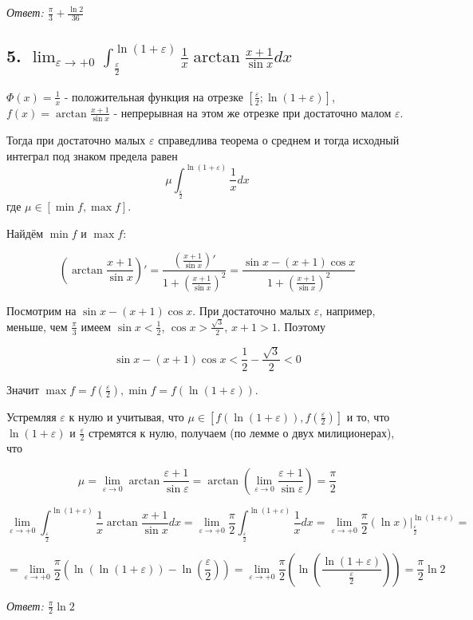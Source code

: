 \documentclass[a4paper]{article}
\begin{document}
\textit{Ответ: $\frac{\pi}{3} + \frac{\ln 2}{36}$}


\subsection*{5. $\displaystyle \lim_{\varepsilon \rightarrow +0} \int_{\frac{\varepsilon}{2}}^{\ln (1+\varepsilon)} \frac{1}{x} \arctan \frac{x+1}{\sin x} dx$}

$\Phi(x) =\frac{1}{x}$ - положительная функция на отрезке $[\frac{\varepsilon}{2}; \ln (1+\varepsilon)]$,
$f(x) = \arctan \frac{x+1}{\sin x}$ - непрерывная на этом же отрезке при достаточно малом $\varepsilon$.
 
Тогда при достаточно малых $\varepsilon$ справедлива теорема о среднем и тогда исходный интеграл под знаком предела равен \[\mu \int_{\frac{\varepsilon}{2}}^{\ln (1+\varepsilon)} \frac{1}{x} dx\] где $\mu \in [\min f, \max f]$.

Найдём $\min f$ и $\max f$:

\[
\left( \arctan \frac{x+1}{\sin x} \right)' = \frac{\left(\frac{x+1}{\sin x}\right)'}{1+\left( \frac{x+1}{\sin x} \right)^2} =  \frac{\sin x - (x+1) \cos x}{1+\left( \frac{x+1}{\sin x} \right)^2}
\]

Посмотрим на $\sin x - (x+1) \cos x$. При достаточно малых $\varepsilon$, например, меньше, чем $\frac{\pi}{3}$ имеем $\sin x < \frac{1}{2}$, $\cos x > \frac{\sqrt{3}}{2}$, $x+1>1$.
Поэтому 

\[
\sin x - (x+1) \cos x < \frac{1}{2} - \frac{\sqrt{3}}{2} < 0
\]

Значит $\max f = f \left( \frac{\varepsilon}{2} \right), \min f = f \left( \ln (1+ \varepsilon) \right)$.

Устремляя $\varepsilon$ к нулю и учитывая, что $\mu \in \left[ f \left( \ln (1+ \varepsilon) \right), f \left( \frac{\varepsilon}{2} \right) \right]$ и то, что $\ln (1 + \varepsilon)$ и $\frac{\varepsilon}{2}$ стремятся к нулю, получаем (по лемме о двух милиционерах), что  

\[\mu = 
\lim_{\varepsilon \rightarrow 0} \arctan \frac{\varepsilon+1}{\sin \varepsilon} = \arctan \left( \lim_{\varepsilon \rightarrow 0} \frac{\varepsilon+1}{\sin \varepsilon} \right) = \frac{\pi}{2}\]

\[\displaystyle \lim_{\varepsilon \rightarrow +0} \int_{\frac{\varepsilon}{2}}^{\ln (1+\varepsilon)} \frac{1}{x} \arctan \frac{x+1}{\sin x} dx = \lim_{\varepsilon \rightarrow +0}  \frac{\pi}{2} \int_{\frac{\varepsilon}{2}}^{\ln (1+\varepsilon)} \frac{1}{x} dx = \lim_{\varepsilon \rightarrow +0} \frac{\pi}{2} \left( \ln x \right) \bigg|_{\frac{\varepsilon}{2}}^{\ln (1+\varepsilon)} = 
\]

\[
= \lim_{\varepsilon \rightarrow +0} \frac{\pi}{2}\left( \ln \left( \ln (1+ \varepsilon) \right) - \ln \left( \frac{\varepsilon}{2} \right) \right) = \lim_{\varepsilon \rightarrow +0} \frac{\pi}{2}\left( \ln \left( \frac{\ln (1+\varepsilon)}{\frac{\varepsilon}{2}} \right) \right) = \frac{\pi}{2} \ln 2
\]

\textit{Ответ: $ \frac{\pi}{2} \ln 2$}
\end{document}
